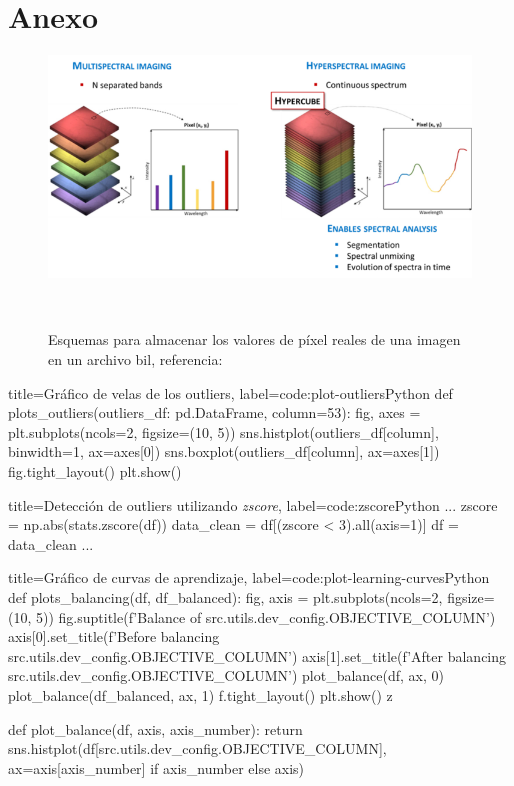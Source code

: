\section{Anexo}\label{sec:anex}

\begin{figure}[!htb]
    \centering
    \includegraphics[width=0.7\linewidth]{media/images/hyperspectral_image.png}
    \caption{Esquemas para almacenar los valores de píxel reales de una imagen en un archivo \acrshort{bil}, referencia:\ \cite{Archivos82:online}}\ \label{fig:hyperspectral_image}
\end{figure}

\begin{code}[numbers=left]{title=Gráfico de velas de los outliers, label=code:plot-outliers}{Python}
def plots_outliers(outliers_df: pd.DataFrame, column=53):
    fig, axes = plt.subplots(ncols=2, figsize=(10, 5))
    sns.histplot(outliers_df[column], binwidth=1, ax=axes[0])
    sns.boxplot(outliers_df[column], ax=axes[1])
    fig.tight_layout()
    plt.show()
\end{code}

\begin{code}[numbers=left]{title=Detección de outliers utilizando \textit{zscore}, label=code:zscore}{Python}
...
    zscore = np.abs(stats.zscore(df))
    data_clean = df[(zscore < 3).all(axis=1)]
    df = data_clean
...
\end{code}

\begin{code}[numbers=left]{title=Gráfico de curvas de aprendizaje, label=code:plot-learning-curves}{Python}
def plots_balancing(df, df_balanced):
    fig, axis = plt.subplots(ncols=2, figsize=(10, 5))
    fig.suptitle(f'Balance of {src.utils.dev_config.OBJECTIVE_COLUMN}')
    axis[0].set_title(f'Before balancing {src.utils.dev_config.OBJECTIVE_COLUMN}')
    axis[1].set_title(f'After balancing {src.utils.dev_config.OBJECTIVE_COLUMN}')
    plot_balance(df, ax, 0)
    plot_balance(df_balanced, ax, 1)
    f.tight_layout()
    plt.show()
z

def plot_balance(df, axis, axis_number):
    return sns.histplot(df[src.utils.dev_config.OBJECTIVE_COLUMN], ax=axis[axis_number] if axis_number else axis)
\end{code}

